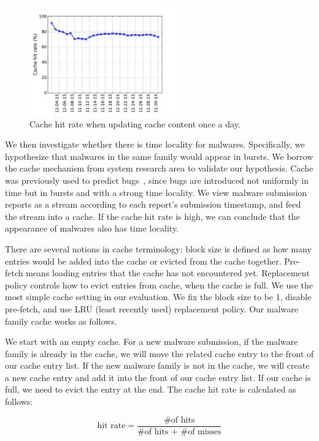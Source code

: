 \begin{figure}[t!]
\begin{center}
\includegraphics[width=2.5in]{figure/LRU_day}
\caption{Cache hit rate when updating cache content once a day.}
\label{fig:batchcache}
\end{center}
\end{figure}

We then investigate whether there is time locality for malwares.
Specifically, we hypothesize that malwares in the same family would appear in bursts.  
We borrow the cache mechanism from system research area to validate our hypothesis. 
Cache was previously used to predict bugs~\cite{predicting}, 
since bugs are introduced not uniformly in time but in bursts and with a strong time locality. 
We view malware submission reports as a stream according to each report's submission timestamp, and feed the stream into a cache. 
If the cache hit rate is high, 
we can conclude that the appearance of malwares also has time locality. 

There are several notions in cache terminology: 
block size is defined as how many entries would be added into the cache or evicted from the cache together.
Pre-fetch means loading entries that the cache has not encountered yet. 
Replacement policy controls how to evict entries from cache, when the cache is full. 
We use the most simple cache setting in our evaluation. We fix the block size to be 1, disable pre-fetch, 
and use LRU (least recently used) replacement policy.
Our malware family cache works as follows.

We start with an empty cache. 
For a new malware submission, if the malware family is already in the cache, 
we will move the related cache entry to the front of our cache entry list. 
If the new malware family is not in the cache, 
we will create a new cache entry and add it into the front of our cache entry list. 
If our cache is full, we need to evict the entry at the end. 
The cache hit rate is calculated as follows: 

$$ \mbox{hit rate} = \dfrac{\mbox{\# of hits}}{\mbox{\# of hits + \# of misses}}$$



